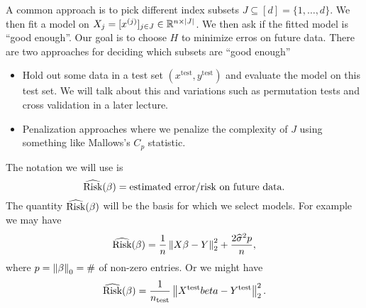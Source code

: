 A common approach is to pick different index subsets $J \subseteq [d] = \{1,\ldots, d\}$. We then fit a model on $X_j = [x^{(j)}]_{j \in J} \in {\mathbb R}^{n \times {\left\lvert J\right\rvert}}$. We then ask if the fitted model is ``good enough''. Our goal is to choose $H$ to minimize erros on future data. There are two approaches for deciding which subsets are ``good enough''
\begin{itemize}
    \item Hold out some data in a test set $(x^{\text{test}}, y^{\text{test}})$ and evaluate the model on this test set. We will talk about this and variations such as permutation tests and cross validation in a later lecture.
    \item Penalization approaches where we penalize the complexity of $J$ using something like Mallows's $C_p$ statistic.
\end{itemize}
The notation we will use is
\[\widehat{\text{Risk}}(\beta) = \text{estimated error/risk on future data}.\]
The quantity $\widehat{\text{Risk}}(\beta)$ will be the basis for which we select models. For example we may have 
\[\widehat{\text{Risk}}(\beta) = \frac{1}{n}\left\|X \beta - Y\right\|_2^2 + \frac{2\widehat{\sigma}^2p}{n}, \]
where $p = \left\|\beta\right\|_0 = \#$ of non-zero entries. Or we might have
\[\widehat{\text{Risk}}(\beta) = \frac{1}{n_{\text{test}}}\left\|X^\text{test}beta - Y^{\text{test}}\right\|_2^2. \]
